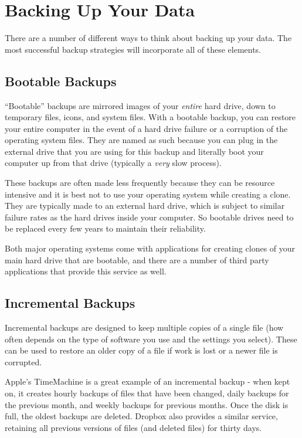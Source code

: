 \documentclass[]{book}
\theoremstyle{definition}
\theoremstyle{definition}
\theoremstyle{definition}
\theoremstyle{remark}
\begin{document}
\section{Backing Up Your Data}\label{backing-up-your-data}

There are a number of different ways to think about backing up your
data. The most successful backup strategies will incorporate all of
these elements.

\subsection{Bootable Backups}\label{bootable-backups}

``Bootable'' backups are mirrored images of your \emph{entire} hard
drive, down to temporary files, icons, and system files. With a bootable
backup, you can restore your entire computer in the event of a hard
drive failure or a corruption of the operating system files. They are
named as such because you can plug in the external drive that you are
using for this backup and literally boot your computer up from that
drive (typically a \emph{very} slow process).

These backups are often made less frequently because they can be
resource intensive and it is best not to use your operating system while
creating a clone. They are typically made to an external hard drive,
which is subject to similar failure rates as the hard drives inside your
computer. So bootable drives need to be replaced every few years to
maintain their reliability.

Both major operating systems come with applications for creating clones
of your main hard drive that are bootable, and there are a number of
third party applications that provide this service as well.

\subsection{Incremental Backups}\label{incremental-backups}

Incremental backups are designed to keep multiple copies of a single
file (how often depends on the type of software you use and the settings
you select). These can be used to restore an older copy of a file if
work is lost or a newer file is corrupted.

Apple's TimeMachine is a great example of an incremental backup - when
kept on, it creates hourly backups of files that have been changed,
daily backups for the previous month, and weekly backups for previous
months. Once the disk is full, the oldest backups are deleted. Dropbox
also provides a similar service, retaining all previous versions of
files (and deleted files) for thirty days.
\end{document}
